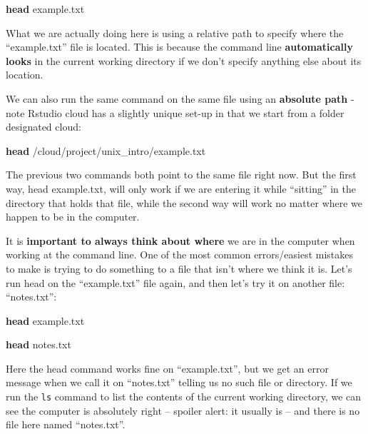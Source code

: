 \documentclass[
]{book}
\newenvironment{Shaded}{\begin{snugshade}}{\end{snugshade}}
\newcommand{\FunctionTok}[1]{\textcolor[rgb]{0.13,0.29,0.53}{\textbf{#1}}}
\newcommand{\NormalTok}[1]{#1}
\begin{document}
\begin{Shaded}
\begin{Highlighting}[]
    \FunctionTok{head}\NormalTok{ example.txt}
\end{Highlighting}
\end{Shaded}

What we are actually doing here is using a relative path to specify where the ``example.txt'' file is located. This is because the command line \textbf{automatically looks} in the current working directory if we don't specify anything else about its location.

We can also run the same command on the same file using an \textbf{absolute path} - note Rstudio cloud has a slightly unique set-up in that we start from a folder designated cloud:

\begin{Shaded}
\begin{Highlighting}[]
    \FunctionTok{head}\NormalTok{ /cloud/project/unix\_intro/example.txt}
\end{Highlighting}
\end{Shaded}

The previous two commands both point to the same file right now. But the first way, head example.txt, will only work if we are entering it while ``sitting'' in the directory that holds that file, while the second way will work no matter where we happen to be in the computer.

It is \textbf{important to always think about where} we are in the computer when working at the command line. One of the most common errors/easiest mistakes to make is trying to do something to a file that isn't where we think it is. Let's run head on the ``example.txt'' file again, and then let's try it on another file: ``notes.txt'':

\begin{Shaded}
\begin{Highlighting}[]
\FunctionTok{head}\NormalTok{ example.txt}
\end{Highlighting}
\end{Shaded}

\begin{Shaded}
\begin{Highlighting}[]
\FunctionTok{head}\NormalTok{ notes.txt}
\end{Highlighting}
\end{Shaded}

Here the head command works fine on ``example.txt'', but we get an error message when we call it on ``notes.txt'' telling us no such file or directory. If we run the \texttt{ls} command to list the contents of the current working directory, we can see the computer is absolutely right -- spoiler alert: it usually is -- and there is no file here named ``notes.txt''.
\end{document}
